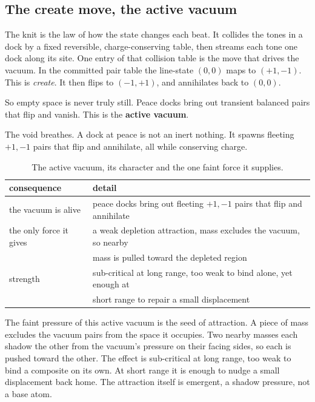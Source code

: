 \subsection{The create move, the active vacuum}

The knit is the law of how the state changes each beat. It collides the tones in a dock by a fixed reversible, charge-conserving table, then streams each tone one dock along its site. One entry of that collision table is the move that drives the vacuum. In the committed pair table the line-state $(0, 0)$ maps to $(+1, -1)$. This is \emph{create}. It then flips to $(-1, +1)$, and annihilates back to $(0, 0)$.

So empty space is never truly still. Peace docks bring out transient balanced pairs that flip and vanish. This is the \textbf{active vacuum}.

\begin{result}
The void breathes. A dock at peace is not an inert nothing. It spawns fleeting $+1, -1$ pairs that flip and annihilate, all while conserving charge.
\end{result}

\begin{table}[ht]
\centering
\begin{tabular}{@{}ll@{}}
\toprule
consequence & detail \\
\midrule
the vacuum is alive & peace docks bring out fleeting $+1, -1$ pairs that flip and annihilate \\
the only force it gives & a weak depletion attraction, mass excludes the vacuum, so nearby \\
 & mass is pulled toward the depleted region \\
strength & sub-critical at long range, too weak to bind alone, yet enough at \\
 & short range to repair a small displacement \\
\bottomrule
\end{tabular}
\caption{The active vacuum, its character and the one faint force it supplies.}
\label{tab:active-vacuum}
\end{table}

The faint pressure of this active vacuum is the seed of attraction. A piece of mass excludes the vacuum pairs from the space it occupies. Two nearby masses each shadow the other from the vacuum's pressure on their facing sides, so each is pushed toward the other. The effect is sub-critical at long range, too weak to bind a composite on its own. At short range it is enough to nudge a small displacement back home. The attraction itself is emergent, a shadow pressure, not a base atom.

